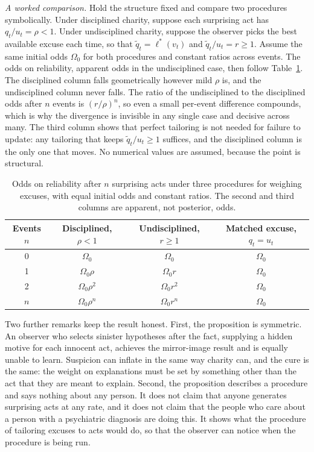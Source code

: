 \documentclass[11pt]{article}
\theoremstyle{definition}
\theoremstyle{remark}
\begin{document}
\emph{A worked comparison.} Hold the structure fixed and compare two procedures symbolically. Under disciplined charity, suppose each surprising act has $q_t/u_t=\rho<1$. Under undisciplined charity, suppose the observer picks the best available excuse each time, so that $\tilde q_t=\ell^{*}(v_t)$ and $\tilde q_t/u_t=r\ge1$. Assume the same initial odds $\Omega_0$ for both procedures and constant ratios across events. The odds on reliability, apparent odds in the undisciplined case, then follow Table~\ref{tab:worked}. The disciplined column falls geometrically however mild $\rho$ is, and the undisciplined column never falls. The ratio of the undisciplined to the disciplined odds after $n$ events is $(r/\rho)^{n}$, so even a small per-event difference compounds, which is why the divergence is invisible in any single case and decisive across many. The third column shows that perfect tailoring is not needed for failure to update: any tailoring that keeps $\tilde q_t/u_t\ge1$ suffices, and the disciplined column is the only one that moves. No numerical values are assumed, because the point is structural.

\begin{table}[ht]
\centering
\small
\renewcommand{\arraystretch}{1.15}
\begin{tabular}{@{}cccc@{}}
\toprule
Events $n$ & Disciplined, $\rho<1$ & Undisciplined, $r\ge1$ & Matched excuse, $q_t=u_t$ \\
\midrule
0 & $\Omega_0$ & $\Omega_0$ & $\Omega_0$ \\
1 & $\Omega_0\rho$ & $\Omega_0 r$ & $\Omega_0$ \\
2 & $\Omega_0\rho^{2}$ & $\Omega_0 r^{2}$ & $\Omega_0$ \\
$n$ & $\Omega_0\rho^{n}$ & $\Omega_0 r^{n}$ & $\Omega_0$ \\
\bottomrule
\end{tabular}
\caption{Odds on reliability after $n$ surprising acts under three procedures for weighing excuses, with equal initial odds and constant ratios. The second and third columns are apparent, not posterior, odds.}
\label{tab:worked}
\end{table}

Two further remarks keep the result honest. First, the proposition is symmetric. An observer who selects sinister hypotheses after the fact, supplying a hidden motive for each innocent act, achieves the mirror-image result and is equally unable to learn. Suspicion can inflate in the same way charity can, and the cure is the same: the weight on explanations must be set by something other than the act that they are meant to explain. Second, the proposition describes a procedure and says nothing about any person. It does not claim that anyone generates surprising acts at any rate, and it does not claim that the people who care about a person with a psychiatric diagnosis are doing this. It shows what the procedure of tailoring excuses to acts would do, so that the observer can notice when the procedure is being run.
\end{document}
